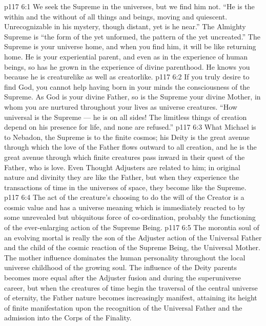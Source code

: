 \vs p117 6:1 We seek the Supreme in the universes, but we find him not. “He is the within and the without of all things and beings, moving and quiescent. Unrecognizable in his mystery, though distant, yet is he near.” The Almighty Supreme is “the form of the yet unformed, the pattern of the yet uncreated.” The Supreme is your universe home, and when you find him, it will be like returning home. He is your experiential parent, and even as in the experience of human beings, so has he grown in the experience of divine parenthood. He knows you because he is creaturelike as well as creatorlike.
\vs p117 6:2 If you truly desire to find God, you cannot help having born in your minds the consciousness of the Supreme. As God is your divine Father, so is the Supreme your divine Mother, in whom you are nurtured throughout your lives as universe creatures. “How universal is the Supreme --- he is on all sides! The limitless things of creation depend on his presence for life, and none are refused.”
\vs p117 6:3 What Michael is to Nebadon, the Supreme is to the finite cosmos; his Deity is the great avenue through which the love of the Father flows outward to all creation, and he is the great avenue through which finite creatures pass inward in their quest of the Father, who is love. Even Thought Adjusters are related to him; in original nature and divinity they are like the Father, but when they experience the transactions of time in the universes of space, they become like the Supreme.
\vs p117 6:4 \pc The act of the creature’s choosing to do the will of the Creator is a cosmic value and has a universe meaning which is immediately reacted to by some unrevealed but ubiquitous force of co\hyp{}ordination, probably the functioning of the ever\hyp{}enlarging action of the Supreme Being.
\vs p117 6:5 The morontia soul of an evolving mortal is really the son of the Adjuster action of the Universal Father and the child of the cosmic reaction of the Supreme Being, the Universal Mother. The mother influence dominates the human personality throughout the local universe childhood of the growing soul. The influence of the Deity parents becomes more equal after the Adjuster fusion and during the superuniverse career, but when the creatures of time begin the traversal of the central universe of eternity, the Father nature becomes increasingly manifest, attaining its height of finite manifestation upon the recognition of the Universal Father and the admission into the Corps of the Finality.
